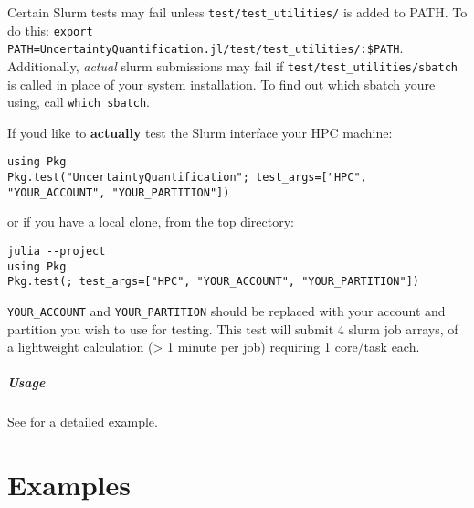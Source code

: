 \begin{tcolorbox}[toptitle=-1mm,bottomtitle=1mm,colback=admonition-warning!50!white,colframe=admonition-warning,title=\textbf{Testing locally on Linux}]
Certain Slurm tests may fail unless \texttt{test/test\_utilities/} is added to PATH. To do this: \texttt{export PATH=UncertaintyQuantification.jl/test/test\_utilities/:\$PATH}. Additionally, \emph{actual} slurm submissions may fail if \texttt{test/test\_utilities/sbatch} is called in place of your system installation. To find out which sbatch you{\textquotesingle}re using, call \texttt{which sbatch}.

\end{tcolorbox}


If you{\textquotesingle}d like to \textbf{actually} test the Slurm interface your HPC machine:




\begin{verbatim}
using Pkg
Pkg.test("UncertaintyQuantification"; test_args=["HPC", "YOUR_ACCOUNT", "YOUR_PARTITION"])
\end{verbatim}



or if you have a local clone, from the top directory:




\begin{verbatim}
julia --project
using Pkg
Pkg.test(; test_args=["HPC", "YOUR_ACCOUNT", "YOUR_PARTITION"])
\end{verbatim}



\texttt{YOUR\_ACCOUNT} and \texttt{YOUR\_PARTITION} should be replaced with your account and partition you wish to use for testing. This test will submit 4 slurm job arrays, of a lightweight calculation (> 1 minute per job) requiring 1 core/task each.



\subsubsection{Usage}



\label{1861020021534494089}{}


See  for a detailed example.



\part{Examples}


